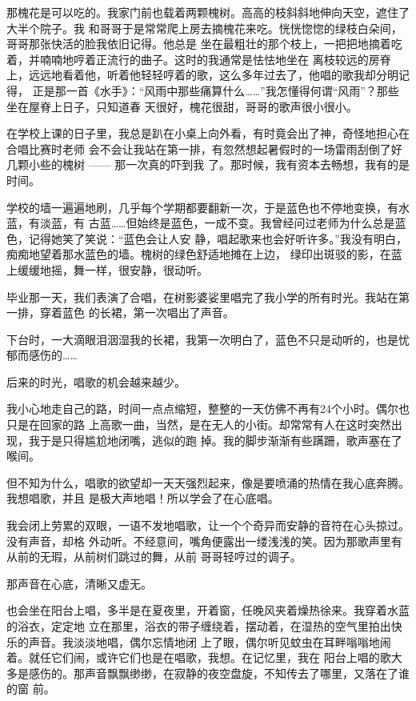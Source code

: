 \documentclass[12pt,a4paper]{article}
\begin{document}
		那槐花是可以吃的。我家门前也载着两颗槐树。高高的枝斜斜地伸向天空，遮住了大半个院子。我
	和哥哥于是常常爬上房去摘槐花来吃。恍恍惚惚的绿枝白朵间，哥哥那张快活的脸我依旧记得。他总是
	坐在最粗壮的那个枝上，一把把地摘着吃着，并喃喃地哼着正流行的曲子。这时的我通常是怯怯地坐在
	离枝较远的房脊上，远远地看着他，听着他轻轻哼着的歌，这么多年过去了，他唱的歌我却分明记得，
	正是那一首《水手》：“风雨中那些痛算什么……”我怎懂得何谓“风雨”？那些坐在屋脊上日子，只知道春
	天很好，槐花很甜，哥哥的歌声很小很小。

		在学校上课的日子里，我总是趴在小桌上向外看，有时竟会出了神，奇怪地担心在合唱比赛时老师
	会不会让我站在第一排，有忽然想起暑假时的一场雷雨刮倒了好几颗小些的槐树 —— 那一次真的吓到我
	了。那时候，我有资本去畅想，我有的是时间。

		学校的墙一遍遍地刷，几乎每个学期都要翻新一次，于是蓝色也不停地变换，有水蓝，有淡蓝，有
	古蓝……但始终是蓝色，一成不变。我曾经问过老师为什么总是蓝色，记得她笑了笑说：“蓝色会让人安
	静，唱起歌来也会好听许多。”我没有明白，痴痴地望着那水蓝色的墙。槐树的绿色舒适地摊在上边，
	绿印出斑驳的影，在蓝上缓缓地摇，舞一样，很安静，很动听。

		毕业那一天，我们表演了合唱，在树影婆娑里唱完了我小学的所有时光。我站在第一排，穿着蓝色
	的长裙，第一次唱出了声音。

		下台时，一大滴眼泪洇湿我的长裙，我第一次明白了，蓝色不只是动听的，也是忧郁而感伤的……

		后来的时光，唱歌的机会越来越少。

		我小心地走自己的路，时间一点点缩短，整整的一天仿佛不再有24个小时。偶尔也只是在回家的路
	上高歌一曲，当然，是在无人的小街。却常常有人在这时突然出现，我于是只得尴尬地闭嘴，逃似的跑
	掉。我的脚步渐渐有些蹒跚，歌声塞在了喉间。

		但不知为什么，唱歌的欲望却一天天强烈起来，像是要喷涌的热情在我心底奔腾。我想唱歌，并且
	是极大声地唱！所以学会了在心底唱。

		我会闭上劳累的双眼，一语不发地唱歌，让一个个奇异而安静的音符在心头掠过。没有声音，却格
	外动听。不经意间，嘴角便露出一缕浅浅的笑。因为那歌声里有从前的无瑕，从前树们跳过的舞，从前
	哥哥轻哼过的调子。

		那声音在心底，清晰又虚无。

		也会坐在阳台上唱，多半是在夏夜里，开着窗，任晚风夹着燥热徐来。我穿着水蓝的浴衣，定定地
	立在那里，浴衣的带子缠绕着，摆动着，在湿热的空气里拍出快乐的声音。我淡淡地唱，偶尔忘情地闭
	上了眼，偶尔听见蚊虫在耳畔嗡嗡地闹着。就任它们闹，或许它们也是在唱歌，我想。在记忆里，我在
	阳台上唱的歌大多是感伤的。那声音飘飘缈缈，在寂静的夜空盘旋，不知传去了哪里，又落在了谁的窗
	前。
\end{document}
